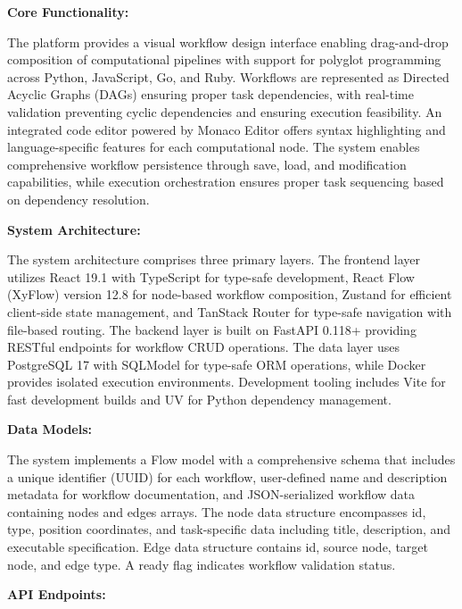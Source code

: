 \documentclass[12pt]{article}
\begin{document}
\textbf{Core Functionality:}

The platform provides a visual workflow design interface enabling drag-and-drop composition of computational pipelines with support for polyglot programming across Python, JavaScript, Go, and Ruby. Workflows are represented as Directed Acyclic Graphs (DAGs) ensuring proper task dependencies, with real-time validation preventing cyclic dependencies and ensuring execution feasibility. An integrated code editor powered by Monaco Editor offers syntax highlighting and language-specific features for each computational node. The system enables comprehensive workflow persistence through save, load, and modification capabilities, while execution orchestration ensures proper task sequencing based on dependency resolution.

\textbf{System Architecture:}

The system architecture comprises three primary layers. The frontend layer utilizes React 19.1 with TypeScript for type-safe development, React Flow (XyFlow) version 12.8 for node-based workflow composition, Zustand for efficient client-side state management, and TanStack Router for type-safe navigation with file-based routing. The backend layer is built on FastAPI 0.118+ providing RESTful endpoints for workflow CRUD operations. The data layer uses PostgreSQL 17 with SQLModel for type-safe ORM operations, while Docker provides isolated execution environments. Development tooling includes Vite for fast development builds and UV for Python dependency management.

\textbf{Data Models:}

The system implements a Flow model with a comprehensive schema that includes a unique identifier (UUID) for each workflow, user-defined name and description metadata for workflow documentation, and JSON-serialized workflow data containing nodes and edges arrays. The node data structure encompasses id, type, position coordinates, and task-specific data including title, description, and executable specification. Edge data structure contains id, source node, target node, and edge type. A ready flag indicates workflow validation status.

\textbf{API Endpoints:}
\end{document}
